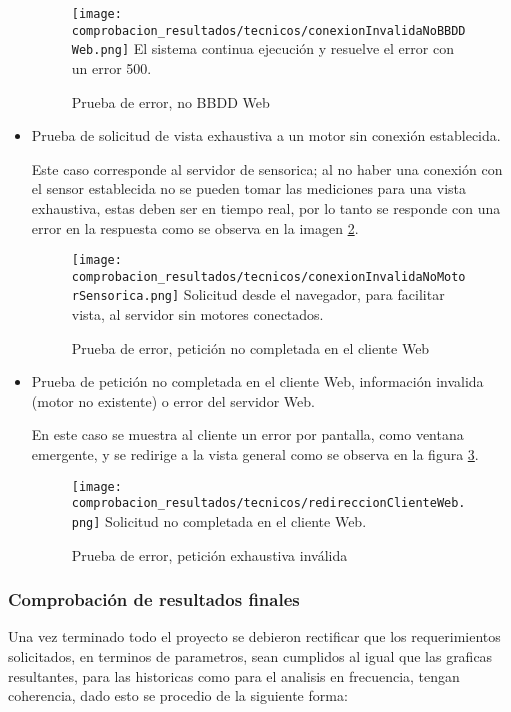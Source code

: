 \begin{itemize}
    \begin{figure}[H]
		\centering
        \caption{Prueba de error, no BBDD Web}
        \texttt{[image: comprobacion\_resultados/tecnicos/conexionInvalidaNoBBDDWeb.png]}
        El sistema continua ejecución y resuelve el error con un error 500.
        \label{img:NoBBDDWeb}
	\end{figure}
%
    \item Prueba de solicitud de vista exhaustiva a un motor sin conexión
        establecida.

        Este caso corresponde al servidor de sensorica; al no haber una conexión
        con el sensor establecida no se pueden tomar las mediciones para una vista
        exhaustiva, estas deben ser en tiempo real, por lo tanto se responde
        con una error en la respuesta como se observa en la imagen \ref{img:ErrorExhaustiva}.
%
    \begin{figure}[H]
		\centering
        \caption{Prueba de error, petición no completada en el cliente Web}
        \texttt{[image: comprobacion\_resultados/tecnicos/conexionInvalidaNoMotorSensorica.png]}
        Solicitud  desde el navegador, para facilitar vista, al servidor
        sin motores conectados.
        \label{img:ErrorExhaustiva}
	\end{figure}
%
    \item Prueba de petición no completada en el cliente Web,
        información invalida (motor no existente) o error del servidor Web.

        En este caso se muestra al cliente un error por pantalla, como ventana
        emergente, y se redirige a la vista general como se observa en la
        figura \ref{img:SolicitudNoCompletada}.

    \begin{figure}[H]
		\centering
        \caption{Prueba de error, petición exhaustiva inválida}
        \texttt{[image: comprobacion\_resultados/tecnicos/redireccionClienteWeb.png]}
        Solicitud no completada en el cliente Web. \label{img:SolicitudNoCompletada}
	\end{figure}
\end{itemize}

\subsubsection{Comprobación de resultados finales}
Una vez terminado todo el proyecto se debieron rectificar que los requerimientos
solicitados, en terminos de parametros, sean cumplidos al igual que las graficas
resultantes, para las historicas como para el analisis en frecuencia, tengan
coherencia, dado esto se procedio de la siguiente forma:

